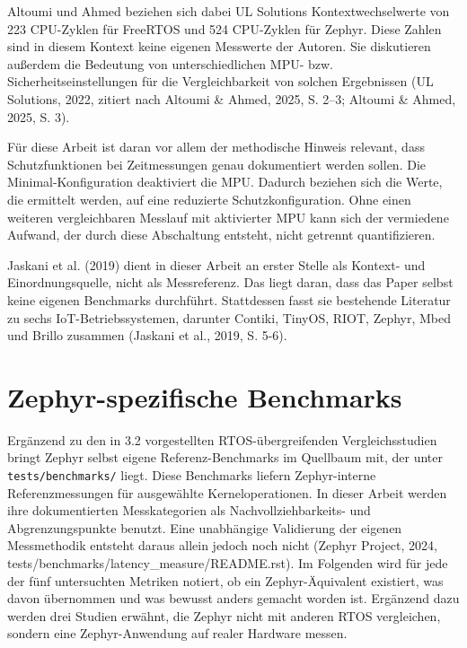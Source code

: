 Altoumi und Ahmed beziehen sich dabei UL Solutions Kontextwechselwerte von 223 CPU-Zyklen f{\"u}r FreeRTOS und 524 CPU-Zyklen f{\"u}r Zephyr. Diese Zahlen sind in diesem Kontext keine eigenen Messwerte der Autoren. Sie diskutieren au{\ss}erdem die Bedeutung von unterschiedlichen MPU- bzw. Sicherheitseinstellungen f{\"u}r die Vergleichbarkeit von solchen Ergebnissen (UL Solutions, 2022, zitiert nach Altoumi \& Ahmed, 2025, S. 2--3; Altoumi \& Ahmed, 2025, S. 3).

F{\"u}r diese Arbeit ist daran vor allem der methodische Hinweis relevant, dass Schutzfunktionen bei Zeitmessungen genau dokumentiert werden sollen. Die Minimal-Konfiguration deaktiviert die MPU. Dadurch beziehen sich die Werte, die ermittelt werden, auf eine reduzierte Schutzkonfiguration. Ohne einen weiteren vergleichbaren Messlauf mit aktivierter MPU kann sich der vermiedene Aufwand, der durch diese Abschaltung entsteht, nicht getrennt quantifizieren.

Jaskani et al. (2019) dient in dieser Arbeit an erster Stelle als Kontext- und Einordnungsquelle, nicht als Messreferenz. Das liegt daran, dass das Paper selbst keine eigenen Benchmarks durchf{\"u}hrt. Stattdessen fasst sie bestehende Literatur zu sechs IoT-Betriebssystemen, darunter Contiki, TinyOS, RIOT, Zephyr, Mbed und Brillo zusammen (Jaskani et al., 2019, S. 5-6).

\section{Zephyr-spezifische Benchmarks}
Erg{\"a}nzend zu den in 3.2 vorgestellten RTOS-{\"u}bergreifenden Vergleichsstudien bringt Zephyr selbst eigene Referenz-Benchmarks im Quellbaum mit, der unter \lstinline[style=fileinline]|tests/benchmarks/| liegt. Diese Benchmarks liefern Zephyr-interne Referenzmessungen f{\"u}r ausgew{\"a}hlte Kerneloperationen. In dieser Arbeit werden ihre dokumentierten Messkategorien als Nachvollziehbarkeits- und Abgrenzungspunkte benutzt. Eine unabh{\"a}ngige Validierung der eigenen Messmethodik entsteht daraus allein jedoch noch nicht (Zephyr Project, 2024, tests/benchmarks/latency\_measure/README.rst). Im Folgenden wird f{\"u}r jede der f{\"u}nf untersuchten Metriken notiert, ob ein Zephyr-{\"A}quivalent existiert, was davon {\"u}bernommen und was bewusst anders gemacht worden ist. Erg{\"a}nzend dazu werden drei Studien erw{\"a}hnt, die Zephyr nicht mit anderen RTOS vergleichen, sondern eine Zephyr-Anwendung auf realer Hardware messen.

